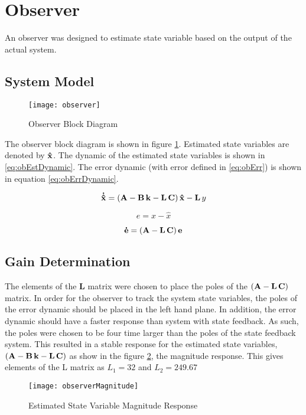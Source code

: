 \section{Observer}

An observer was designed to estimate state variable based on the output of the actual system.

\subsection{System Model}

\begin{figure}[h]
    \centering
    \texttt{[image: observer]}
    \caption{Observer Block Diagram}
    \label{fig:observer}
\end{figure}

The observer block diagram is shown in figure \ref{fig:observer}.
Estimated state variables are denoted by ${\bf \hat{x}}$.
The dynamic of the estimated state variables is shown in \ref{eq:obEstDynamic}.
The error dynamic (with error defined in \ref{eq:obErr}) is shown in equation \ref{eq:obErrDynamic}.

\begin{equation}
	\label{eq:obEstDynamic}
	{\bf \dot{\hat{x}}} = ({\bf A} - {\bf B\,k} - {\bf L\,C})\,{\bf \hat{x}} - {\bf L}\,y
\end{equation}

\begin{equation}
	\label{eq:obErr}
	e = x - \hat{x}
\end{equation}

\begin{equation}
	\label{eq:obErrDynamic}
	{\bf \dot{e}} = ({\bf A} - {\bf L\,C})\,{\bf e}
\end{equation}

\subsection{Gain Determination}

The elements of the {\bf L} matrix were chosen to place the poles of the $({\bf A} - {\bf L\,C})$ matrix.
In order for the observer to track the system state variables, the poles of the error dynamic should be placed in the left hand plane.
In addition, the error dynamic should have a faster response than system with state feedback.
As such, the poles were chosen to be four time larger than the poles of the state feedback system.
This resulted in a stable response for the estimated state variables, $({\bf A} - {\bf B\,k} - {\bf L\,C})$ as show in the figure \ref{fig:obMagResp}, the magnitude response.
This gives elements of the L matrix as $L_1 = 32$ and $L_2 = 249.67$

\begin{figure}[h]
    \centering
    \texttt{[image: observerMagnitude]}
    \caption{Estimated State Variable Magnitude Response}
    \label{fig:obMagResp}
\end{figure}

